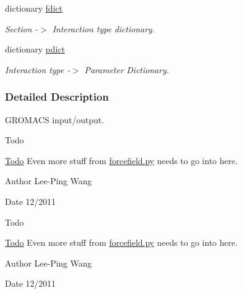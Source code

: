 \begin{DoxyCompactItemize}
dictionary \hyperlink{namespaceforcebalance_1_1gmxio_ac4e46dd6adabe0dfdeddcd86e772ad33}{fdict}
\begin{DoxyCompactList}\small\item\em \-Section -\/$>$ \-Interaction type dictionary. \end{DoxyCompactList}\item 
dictionary \hyperlink{namespaceforcebalance_1_1gmxio_afa3ee5e262ff005d87d20b4ec1581bad}{pdict}
\begin{DoxyCompactList}\small\item\em \-Interaction type -\/$>$ \-Parameter \-Dictionary. \end{DoxyCompactList}\end{DoxyCompactItemize}


\subsubsection{\-Detailed \-Description}
\-G\-R\-O\-M\-A\-C\-S input/output. \begin{DoxyRefDesc}{\-Todo}
\item[\hyperlink{todo__todo000009}{\-Todo}]\-Even more stuff from \hyperlink{forcefield_8py}{forcefield.\-py} needs to go into here.\end{DoxyRefDesc}


\begin{DoxyAuthor}{\-Author}
\-Lee-\/\-Ping \-Wang 
\end{DoxyAuthor}
\begin{DoxyDate}{\-Date}
12/2011
\end{DoxyDate}
\begin{DoxyRefDesc}{\-Todo}
\item[\hyperlink{todo__todo000012}{\-Todo}]\-Even more stuff from \hyperlink{forcefield_8py}{forcefield.\-py} needs to go into here.\end{DoxyRefDesc}


\begin{DoxyAuthor}{\-Author}
\-Lee-\/\-Ping \-Wang 
\end{DoxyAuthor}
\begin{DoxyDate}{\-Date}
12/2011 
\end{DoxyDate}



